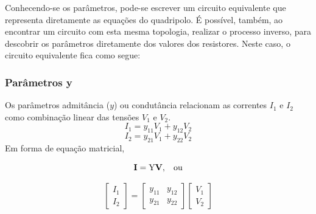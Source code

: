 \documentclass{article}
\numberwithin{equation}{section}
\begin{document}
Conhecendo-se os parâmetros, pode-se escrever um circuito equivalente que representa diretamente as equações do quadripolo. É possível, também, ao encontrar um circuito com esta mesma topologia, realizar o processo inverso, para descobrir os parâmetros diretamente dos valores dos resistores. Neste caso, o circuito equivalente fica como segue:

\begin{center}
\end{center}

\subsubsection{Parâmetros y}
\label{subsubsec:quadripolosy}
Os parâmetros admitância ($y$) ou condutância relacionam as correntes $I_{1}$ e $I_{2}$ como combinação linear das tensões $V_{1}$ e $V_{2}$.
\begin{equation*}
    I_{1}=y_{11}V_{1}+y_{12}V_{2}
\end{equation*}
\begin{equation*}
    I_{2}=y_{21}V_{1}+y_{22}V_{2}
\end{equation*}
Em forma de equação matricial,

\begin{equation*}
    \textbf{I}=\text{Y}\textbf{V}, \hspace{0.3cm} \text{ou}
\end{equation*}

\begin{equation}
    \begin{bmatrix}
        I_{1} \\
        I_{2}
    \end{bmatrix}
    = %
    \begin{bmatrix}
        y_{11} & y_{12} \\
        y_{21} & y_{22}
    \end{bmatrix}
    \begin{bmatrix}
        V_{1} \\
        V_{2}
    \end{bmatrix}
\end{equation}
\end{document}
